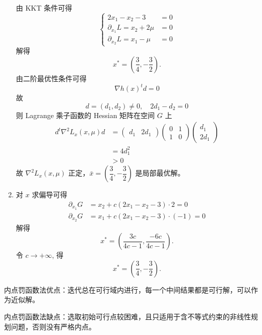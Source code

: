 \begin{example}
\begin{enumerate}
        由 KKT 条件可得 
        \[
            \begin{cases}
                2x_1 - x_2 - 3 &= 0\\
                \partial_{x_1}L = x_2 + 2\mu &= 0\\
                \partial_{x_2}L = x_1 - \mu &= 0
            \end{cases}
        \]
        解得
        \[
            x^* = \left(\dfrac{3}{4}, -\dfrac{3}{2}\right).
        \]
        由二阶最优性条件可得 
        \[
            \nabla h(x)^td = 0
        \]
        故
        \[
            d = \left(d_1, d_2\right) \neq 0,\quad 2d_1 - d_2 = 0
        \]
        则 Lagrange 乘子函数的 Hessian 矩阵在空间 $G$ 上 
        \begin{align*}
            d^t\nabla^2L_x(x, \mu)d &= \begin{pmatrix}
                d_1 & 2d_1
            \end{pmatrix}\begin{pmatrix}
                0 & 1 \\ 1 & 0
            \end{pmatrix}\begin{pmatrix}
                d_1 \\ 2d_1
            \end{pmatrix}\\
            &= 4d_1^2\\
            &> 0
        \end{align*}
        故 $\nabla^2L_x(x, \mu)$ 正定，$\bar{x} = \left(\dfrac{3}{4}, -\dfrac{3}{2}\right)$ 是局部最优解。
        \item 对 $x$ 求偏导可得 
        \begin{align*}
            \partial_{x_1}G &= x_2 + c(2x_1 - x_2 - 3) \cdot 2 = 0\\
            \partial_{x_2}G &= x_1 + c(2x_1 - x_2 - 3) \cdot (-1) = 0
        \end{align*}
        解得 
        \[
            x^* = \left(\dfrac{3c}{4c - 1}, \dfrac{-6c}{4c - 1}\right).
        \]
        令 $c \to +\infty$, 得
        \[
            x^* = \left(\dfrac{3}{4}, -\dfrac{3}{2}\right).
        \]
    \end{enumerate}
\end{example}


\begin{note}
    内点罚函数法优点：迭代总在可行域内进行，每一个中间结果都是可行解，可以作为近似解。

    内点罚函数法缺点：选取初始可行点较困难，且只适用于含不等式约束的非线性规划问题，否则没有严格内点。
\end{note}

